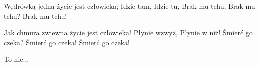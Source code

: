\documentclass[../../../songbook.tex]{subfiles}
\begin{document}
Wędrówką jedną życie jest człowieka; \newline
Idzie tam, \newline
Idzie tu, \newline
Brak mu tchu, \newline
Brak mu tchu? \newline
Brak mu tchu! \newline

Jak chmura zwiewna życie jest człowieka! \newline
Płynie wzwyż, \newline
Płynie w niż! \newline
Śmierć go czeka? \newline
Śmierć go czeka! \newline
Śmierć go czeka! \newline

\-\hspace{1cm} To nic... \newline
\end{document}

